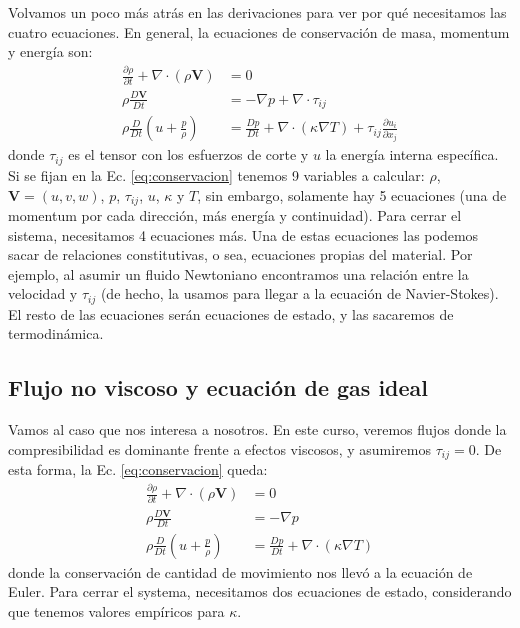 Volvamos un poco más atrás en las derivaciones para ver por qué necesitamos las cuatro ecuaciones.
En general, la ecuaciones de conservación de masa, momentum y energía son:
%
\begin{align}\label{eq:conservacion}
\frac{\partial\rho}{\partial t} + \nabla\cdot(\rho\mathbf{V})&=0\nonumber\\
\rho\frac{D\mathbf{V}}{Dt} &= -\nabla p + \nabla\cdot\tau_{ij}\nonumber\\
\rho\frac{D}{Dt}\left(u+\frac{p}{\rho}\right) &= \frac{Dp}{Dt}+\nabla\cdot(\kappa\nabla T) + \tau_{ij}\frac{\partial u_i}{\partial x_j}
\end{align}
%
donde $\tau_{ij}$ es el tensor con los esfuerzos de corte y $u$ la energía interna específica.
Si se fijan en la Ec. \eqref{eq:conservacion} tenemos 9 variables a calcular: $\rho$, $\mathbf{V}=(u,v,w)$, $p$, $\tau_{ij}$, $u$, $\kappa$ y $T$, sin embargo, solamente hay 5 ecuaciones (una de momentum por cada dirección, más energía y continuidad).
Para cerrar el sistema, necesitamos 4 ecuaciones más.
Una de estas ecuaciones las podemos sacar de relaciones constitutivas, o sea, ecuaciones propias del material. 
Por ejemplo, al asumir un fluido Newtoniano encontramos una relación entre la velocidad y $\tau_{ij}$ (de hecho, la usamos para llegar a la ecuación de Navier-Stokes).
El resto de las ecuaciones serán ecuaciones de estado, y las sacaremos de termodinámica.

\subsection*{Flujo no viscoso y ecuación de gas ideal}
Vamos al caso que nos interesa a nosotros.
En este curso, veremos flujos donde la compresibilidad es dominante frente a efectos viscosos, y asumiremos $\tau_{ij}=0$.
De esta forma, la Ec. \eqref{eq:conservacion} queda:
%
\begin{align}\label{eq:conservacion_novisc}
\frac{\partial\rho}{\partial t} + \nabla\cdot(\rho\mathbf{V})&=0\nonumber\\
\rho\frac{D\mathbf{V}}{Dt} &= -\nabla p \nonumber\\
\rho\frac{D}{Dt}\left(u+\frac{p}{\rho}\right) &= \frac{Dp}{Dt}+\nabla\cdot(\kappa\nabla T) 
\end{align}
%
donde la conservación de cantidad de movimiento nos llevó a la ecuación de Euler.
Para cerrar el systema, necesitamos dos ecuaciones de estado, considerando que tenemos valores empíricos para $\kappa$.

